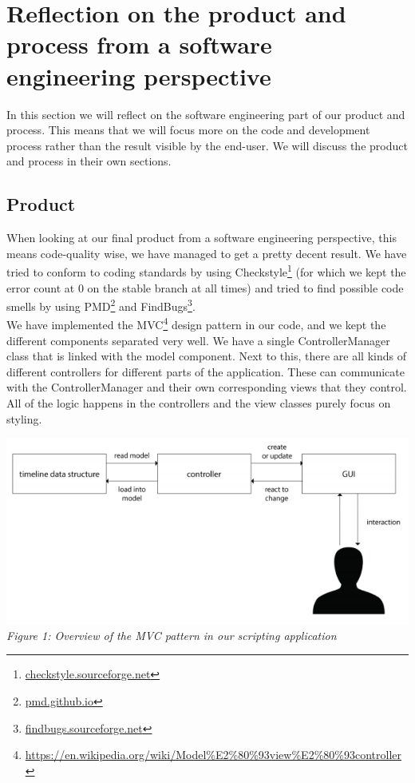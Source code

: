 \section{Reflection on the product and process from a software engineering perspective}

In this section we will reflect on the software engineering part of our product and process. This means that we will focus more on the code and development process rather than the result visible by the end-user. We will discuss the product and process in their own sections.

\subsection{Product}
When looking at our final product from a software engineering perspective, this means code-quality wise, we have managed to get a pretty decent result. We have tried to conform to coding standards by using Checkstyle\footnote{\url{checkstyle.sourceforge.net}} (for which we kept the error count at 0 on the stable branch at all times) and tried to find possible code smells by using PMD\footnote{\url{pmd.github.io}} and FindBugs\footnote{\url{findbugs.sourceforge.net}}.\\
We have implemented the MVC\footnote{\url{https://en.wikipedia.org/wiki/Model\%E2\%80\%93view\%E2\%80\%93controller}} design pattern in our code, and we kept the different components separated very well. We have a single ControllerManager class that is linked with the model component. Next to this, there are all kinds of different controllers for different parts of the application. These can communicate with the ControllerManager and their own corresponding views that they control. All of the logic happens in the controllers and the view classes purely focus on styling.\\
\begin{center}
\includegraphics[scale=1]{./images/mvc}\\
\textit{Figure 1: Overview of the MVC pattern in our scripting application}\\
\end{center}
